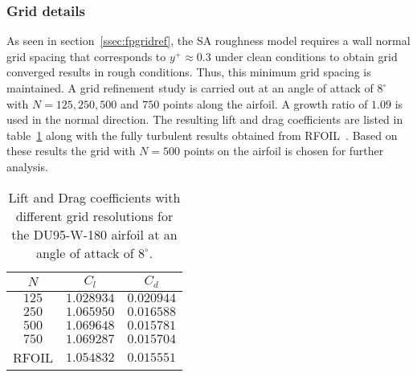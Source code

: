\subsubsection{Grid details}
As seen in section~\ref{ssec:fpgridref}, the SA roughness model requires a wall normal grid spacing that corresponds to $y^+\approx0.3$ under clean conditions to obtain grid converged results in rough conditions. Thus, this minimum grid spacing is maintained. A grid refinement study is carried out at an angle of attack of $8^{\circ}$ with $N=125,250,500$ and $750$ points along the airfoil. A growth ratio of $1.09$ is used in the normal direction. The resulting lift and drag coefficients are listed in table~\ref{tab:dugridref} along with the fully turbulent results obtained from RFOIL~\cite{rfoil_orig}. Based on these results the grid with $N=500$ points on the airfoil is chosen for further analysis.
\begin{table}[h!]
\centering
\captionsetup{justification=centering}
\begin{tabular}{ |c|c|c| } 
\hline
$N$ & $C_l$ & $C_d$ \\
 \hline
 $125$ & $1.028934$ & $0.020944$ \\ 
 $250$ & $1.065950$ & $0.016588$ \\ 
 $500$ & $1.069648$ & $0.015781$ \\ 
 $750$ & $1.069287$ & $0.015704$ \\ 
 RFOIL & $1.054832$ & $0.015551$ \\
 \hline
\end{tabular}
\caption{Lift and Drag coefficients with different grid resolutions for the DU95-W-180 airfoil at an angle of attack of $8^{\circ}$.}
\label{tab:dugridref}
\end{table}

